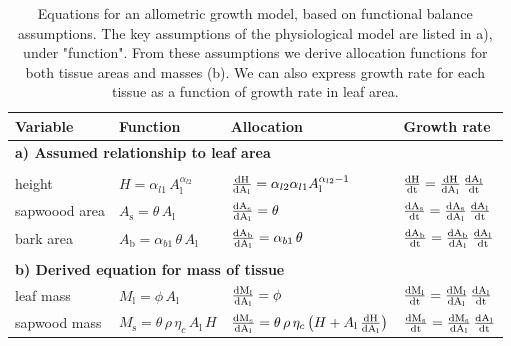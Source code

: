 \documentclass[10pt,twoside]{article}
\begin{document}
\begin{table}[h!]
\caption{Equations for an allometric growth model, based on functional balance assumptions.
The key assumptions of the physiological model are listed in a), under "function". From these
assumptions we derive allocation functions for both tissue areas and masses (b). We can also
express growth rate for each tissue as a function of growth rate in leaf area. }
\centering
  \begin{tabular}{p{2.5cm}p{3.5cm}p{5cm}p{4cm} }\\ \hline
  Variable & Function & Allocation & Growth rate\\ \hline
  \multicolumn{4}{l}{\textbf{a) Assumed relationship to leaf area}} \\ \\
  height &
    $H = \alpha_{l1} \, A_\textrm{l}^{\alpha_{l2}}$ &
    $\frac{\rm{d}H}{\rm{d}A_\textrm{l}} = \alpha_{l2} \alpha_{l1} A_\textrm{l}^{\alpha_{l2}-1}$ &
    $\frac{\rm{d}H}{\rm{d}t} = \frac{\rm{d}H}{\rm{d}A_\textrm{l}} \, \frac{\rm{d}A_\textrm{l}}{\rm{d}t}$ \\
  sapwoood area &
    $A_\textrm{s} = \theta \, A_\textrm{l}$ &
    $\frac{\rm{d}A_\textrm{s}}{\rm{d} A_\textrm{l}} = \theta$ &
    $\frac{\rm{d}A_\textrm{s}}{\rm{d}t} = \frac{\rm{d}A_\textrm{s}}{\rm{d} A_\textrm{l}} \, \frac{\rm{d}A_\textrm{l}}{\rm{d}t}$ \\
  bark area &
    $A_\textrm{b} = \alpha_{b1} \, \theta \, A_\textrm{l}$ &
    $\frac{\rm{d}A_\textrm{b}}{\rm{d} A_\textrm{l}} = \alpha_{b1} \, \theta$ &
    $\frac{\rm{d}A_\textrm{b}}{\rm{d}t} = \frac{\rm{d}A_\textrm{b}}{\rm{d} A_\textrm{l}} \, \frac{\rm{d}A_\textrm{l}}{\rm{d}t}$ \\  \\
  \multicolumn{4}{l}{\textbf{b) Derived equation for mass of tissue }} \\
  leaf mass &
    $M_\textrm{l} = \phi \, A_\textrm{l} $ &
    $\frac{\rm{d}M_\textrm{l}}{\rm{d}A_\textrm{l}} = \phi$ &
    $\frac{\rm{d}M_\textrm{l}}{\rm{d}t} = \frac{\rm{d}M_\textrm{l}}{\rm{d}A_\textrm{l}} \, \frac{\rm{d}A_\textrm{l}}{\rm{d}t}$ \\
  sapwood mass &
    $M_\textrm{s} = \theta \, \rho \, \eta_c \, A_\textrm{l} \, H $ &
    $\frac{\rm{d}M_\textrm{s}}{\rm{d}A_\textrm{l}} = \theta \, \rho \, \eta_c \, \big(H + A_\textrm{l} \, \frac{\rm{d}H}{\rm{d}A_\textrm{l}} \big)$ &
    $\frac{\rm{d}M_\textrm{s}}{\rm{d}t} = \frac{\rm{d}M_\textrm{s}}{\rm{d}A_\textrm{l}} \, \frac{\rm{d}A_\textrm{l}}{\rm{d}t}$ \\

\end{tabular}
\end{table}
\end{document}
